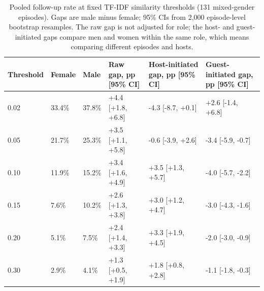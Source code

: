 \begin{table}[htbp]
\centering
\small
\caption{Pooled follow-up rate at fixed TF-IDF similarity thresholds (131 mixed-gender episodes). Gaps are male minus female; 95\% CIs from 2,000 episode-level bootstrap resamples. The raw gap is not adjusted for role; the host- and guest-initiated gaps compare men and women within the same role, which means comparing different episodes and hosts.}
\label{tab:table11_corrected}
\begin{tabular}{llllll}
\toprule
Threshold & Female & Male & Raw gap, pp [95\% CI] & Host-initiated gap, pp [95\% CI] & Guest-initiated gap, pp [95\% CI] \\
\midrule
0.02 & 33.4\% & 37.8\% & +4.4 [+1.8, +6.8] & -4.3 [-8.7, +0.1] & +2.6 [-1.4, +6.8] \\
0.05 & 21.7\% & 25.3\% & +3.5 [+1.1, +5.8] & -0.6 [-3.9, +2.6] & -3.4 [-5.9, -0.7] \\
0.10 & 11.9\% & 15.2\% & +3.4 [+1.6, +4.9] & +3.5 [+1.3, +5.7] & -4.0 [-5.7, -2.2] \\
0.15 & 7.6\% & 10.2\% & +2.6 [+1.3, +3.8] & +3.0 [+1.2, +4.7] & -3.0 [-4.3, -1.6] \\
0.20 & 5.1\% & 7.5\% & +2.4 [+1.4, +3.3] & +3.3 [+1.9, +4.5] & -2.0 [-3.0, -0.9] \\
0.30 & 2.9\% & 4.1\% & +1.3 [+0.5, +1.9] & +1.8 [+0.8, +2.8] & -1.1 [-1.8, -0.3] \\
\bottomrule
\end{tabular}
\end{table}
